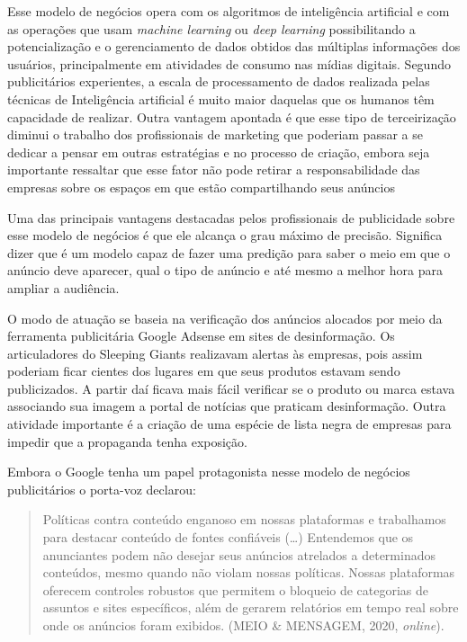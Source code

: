 Esse modelo de negócios opera com os algoritmos de inteligência
artificial e com as operações que usam \textit{machine learning} ou
\textit{deep learning} possibilitando a potencialização e o gerenciamento
de dados obtidos das múltiplas informações dos usuários, principalmente
em atividades de consumo nas mídias digitais. Segundo publicitários
experientes, a escala de processamento de dados realizada pelas técnicas
de Inteligência artificial é muito maior daquelas que os humanos têm
capacidade de realizar. Outra vantagem apontada é que esse tipo de
terceirização diminui o trabalho dos profissionais de marketing que
poderiam passar a se dedicar a pensar em outras estratégias e no
processo de criação, embora seja importante ressaltar que esse fator não
pode retirar a responsabilidade das empresas sobre os espaços em que
estão compartilhando seus anúncios

Uma das principais vantagens destacadas pelos profissionais de
publicidade sobre esse modelo de negócios é que ele alcança o grau
máximo de precisão. Significa dizer que é um modelo capaz de fazer uma
predição para saber o meio em que o anúncio deve aparecer, qual o tipo
de anúncio e até mesmo a melhor hora para ampliar a audiência.

O modo de atuação se baseia na verificação dos anúncios alocados por
meio da ferramenta publicitária Google Adsense em sites de
desinformação. Os articuladores do Sleeping Giants realizavam alertas às
empresas, pois assim poderiam ficar cientes dos lugares em que seus
produtos estavam sendo publicizados. A partir daí ficava mais fácil
verificar se o produto ou marca estava associando sua imagem a portal de
notícias que praticam desinformação. Outra atividade importante é a
criação de uma espécie de lista negra de empresas para impedir que a
propaganda tenha exposição.

Embora o Google tenha um papel protagonista nesse modelo de negócios
publicitários o porta-voz declarou:

\begin{quote}
Políticas contra conteúdo enganoso em nossas plataformas e trabalhamos
para destacar conteúdo de fontes confiáveis (\ldots) Entendemos que os
anunciantes podem não desejar seus anúncios atrelados a determinados
conteúdos, mesmo quando não violam nossas políticas. Nossas plataformas
oferecem controles robustos que permitem o bloqueio de categorias de
assuntos e sites específicos, além de gerarem relatórios em tempo real
sobre onde os anúncios foram exibidos. (MEIO \& MENSAGEM, 2020,
\textit{online}).
\end{quote}

